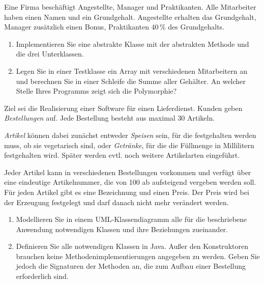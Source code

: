 Eine Firma beschäftigt Angestellte, Manager und Praktikanten. Alle Mitarbeiter haben einen Namen und ein Grundgehalt. Angestellte erhalten das Grundgehalt, Manager zusätzlich einen Bonus, Praktikanten 40\,\% des Grundgehalts.
\begin{enumerate}[label=\alph*)]
\item Implementieren Sie eine abstrakte Klasse  mit der abstrakten Methode  und die drei Unterklassen.
\item Legen Sie in einer Testklasse ein Array mit verschiedenen Mitarbeitern an und berechnen Sie in einer Schleife die Summe aller Gehälter. An welcher Stelle Ihres Programms zeigt sich die Polymorphie?
\end{enumerate}

Ziel sei die Realisierung einer Software für einen Lieferdienst. Kunden geben \emph{Bestellungen} auf. Jede Bestellung besteht aus maximal 30 Artikeln.

\emph{Artikel} können dabei zunächst entweder \emph{Speisen} sein, für die festgehalten werden muss, ob sie vegetarisch sind, oder \emph{Getränke}, für die die Füllmenge in Millilitern festgehalten wird. Später werden evtl. noch weitere Artikelarten eingeführt.

Jeder Artikel kann in verschiedenen Bestellungen vorkommen und verfügt über eine eindeutige Artikelnummer, die von 100 ab aufsteigend vergeben werden soll. Für jeden Artikel gibt es eine Bezeichnung und einen Preis. Der Preis wird bei der Erzeugung festgelegt und darf danach nicht mehr verändert werden.
\begin{enumerate}[label=\alph*)]
\item Modellieren Sie in einem UML-Klassendiagramm alle für die beschriebene Anwendung notwendigen Klassen und ihre Beziehungen zueinander.
\item Definieren Sie alle notwendigen Klassen in Java. Außer den Konstruktoren brauchen keine Methodenimplementierungen angegeben zu werden. Geben Sie jedoch die Signaturen der Methoden an, die zum Aufbau einer Bestellung erforderlich sind.
\end{enumerate}

